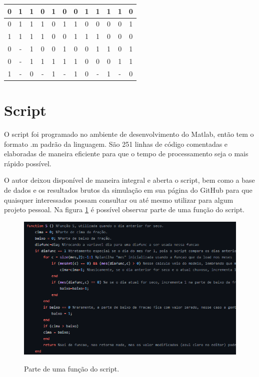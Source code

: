 \begin{table}[H]
\begin{tabular}{|c|c|c|c|c|c|c|c|c|c|c|c|}
0 & 1 & 1 & 0 & 1 & 0 & 0 & 1 & 1 & 1 & 1 & 0 \\ \hline
0 & 1 & 1 & 1 & 0 & 1 & 1 & 0 & 0 & 0 & 0 & 1 \\ \hline
1 & 1 & 1 & 1 & 0 & 0 & 1 & 1 & 1 & 0 & 0 & 0 \\ \hline
0 & - & 1 & 0 & 0 & 1 & 0 & 0 & 1 & 1 & 0 & 1 \\ \hline
0 & - & 1 & 1 & 1 & 1 & 1 & 0 & 0 & 0 & 1 & 1 \\ \hline
1 & - & 0 & - & 1 & - & 1 & 0 & - & 1 & - & 0 \\ \hline
\end{tabular}
\vspace*{15px}
\end{table}



\section{Script}
\label{s.io}
O script foi programado no ambiente de desenvolvimento do Matlab, então tem o formato .m padrão da linguagem. São 251 linhas de código comentadas e elaboradas de maneira eficiente para que o tempo de processamento seja o mais rápido possível.

O autor deixou disponível de maneira integral e aberta o script, bem como a base de dados e os resultados brutos da simulação em sua página do GitHub \cite{script-tcc} para que quaisquer interessados possam consultar ou até mesmo utilizar para algum projeto pessoal. Na figura \ref{f.example-script} é possível observar parte de uma função do script.

\begin{figure}[H]
	\caption{\small Parte de uma função do script.}
	\centering
	\includegraphics[width=\textwidth]{figs/example-script.png}
	\label{f.example-script}
\end{figure}







